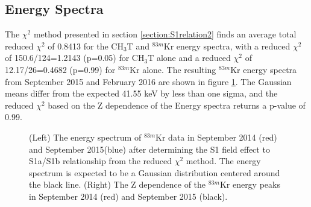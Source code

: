 \subsection{Energy Spectra}\label{Result:Spectra}

The $\chi^2$ method presented in section \ref{section:S1relation2} finds an average total reduced $\chi^2$ of 0.8413 for the CH$_3$T and $^{83m}$Kr energy spectra, with a reduced $\chi^2$ of  150.6/124=1.2143 (p=0.05) for CH$_3$T alone and a reduced $\chi^2$ of 12.17/26=0.4682 (p=0.99) for $^{83m}$Kr alone.  The resulting $^{83m}$Kr energy spectra from September 2015 and February 2016 are shown in figure \ref{Kr2p22_KrE}.  The Gaussian means differ from the expected 41.55 keV by less than one sigma, and the reduced $\chi^2$ based on the Z dependence of the Energy spectra returns a p-value of 0.99.

\begin{figure}
\centering
{}
\qquad
{}
\caption{ (Left) The energy spectrum of $^{83m}$Kr data in September 2014 (red) and September 2015(blue) after determining the S1 field effect to S1a/S1b relationship from the reduced $\chi^2$ method. The energy spectrum is expected to be a Gaussian distribution centered around the black line.  (Right) The Z dependence of the $^{83m}$Kr energy peaks in September 2014 (red) and September 2015 (black).}
\label{Kr2p22_KrE}
\end{figure}

